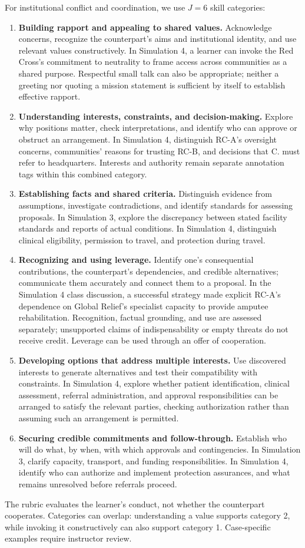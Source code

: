 \documentclass[11pt]{article}
\begin{document}
For institutional conflict and coordination, we use $J=6$ skill categories:
\begin{enumerate}
\item \textbf{Building rapport and appealing to shared values.} Acknowledge concerns,
recognize the counterpart's aims and institutional identity, and use relevant values
constructively. In Simulation 4, a learner can invoke the Red Cross's commitment to
neutrality to frame access across communities as a shared purpose. Respectful small talk
can also be appropriate; neither a greeting nor quoting a mission statement is sufficient
by itself to establish effective rapport.
\item \textbf{Understanding interests, constraints, and decision-making.} Explore why
positions matter, check interpretations, and identify who can approve or obstruct an
arrangement. In Simulation 4, distinguish RC-A's oversight concerns, communities' reasons
for trusting RC-B, and decisions that C. must refer to headquarters. Interests and
authority remain separate annotation tags within this combined category.
\item \textbf{Establishing facts and shared criteria.} Distinguish evidence from
assumptions, investigate contradictions, and identify standards for assessing proposals.
In Simulation 3, explore the discrepancy between stated facility standards and reports
of actual conditions. In Simulation 4, distinguish clinical eligibility, permission to
travel, and protection during travel.
\item \textbf{Recognizing and using leverage.} Identify one's consequential
contributions, the counterpart's dependencies, and credible alternatives; communicate
them accurately and connect them to a proposal. In the Simulation 4 class discussion,
a successful strategy made explicit RC-A's dependence on Global Relief's specialist
capacity to provide amputee rehabilitation. Recognition, factual grounding, and use are
assessed separately; unsupported claims of indispensability or empty threats do not
receive credit. Leverage can be used through an offer of cooperation.
\item \textbf{Developing options that address multiple interests.} Use discovered
interests to generate alternatives and test their compatibility with constraints.
In Simulation 4, explore whether patient identification, clinical assessment, referral
administration, and approval responsibilities can be arranged to satisfy the relevant
parties, checking authorization rather than assuming such an arrangement is permitted.
\item \textbf{Securing credible commitments and follow-through.} Establish who will do
what, by when, with which approvals and contingencies. In Simulation 3, clarify capacity,
transport, and funding responsibilities. In Simulation 4, identify who can authorize and
implement protection assurances, and what remains unresolved before referrals proceed.
\end{enumerate}
The rubric evaluates the learner's conduct, not whether the counterpart cooperates.
Categories can overlap: understanding a value supports category 2, while invoking it
constructively can also support category 1. Case-specific examples require instructor review.
\end{document}
